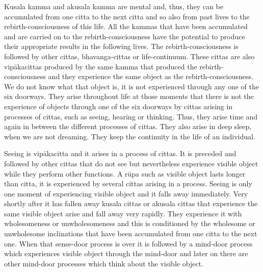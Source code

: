 Kusala kamma and akusala kamma are mental and, thus, they can be
accumulated from one citta to the next citta and so also from past lives
to the rebirth-consciousness of this life. All the kammas that have been
accumulated and are carried on to the rebirth-consciousness have the
potential to produce their appropriate results in the following lives.
The rebirth-consciousness is followed by other cittas, bhavanga-cittas
or life-continuum. These cittas are also vipākacittas produced by the
same kamma that produced the rebirth-consciousness and they experience
the same object as the rebirth-consciousness. We do not know what that
object is, it is not experienced through any one of the six doorways.
They arise throughout life at those moments that there is not the
experience of objects through one of the six doorways by cittas arising
in processes of cittas, such as seeing, hearing or thinking. Thus, they
arise time and again in between the different processes of cittas. They
also arise in deep sleep, when we are not dreaming. They keep the
continuity in the life of an individual.

Seeing is vipākacitta and it arises in a process of cittas. It is
preceded and followed by other cittas that do not see but nevertheless
experience visible object while they perform other functions. A rūpa
such as visible object lasts longer than citta, it is experienced by
several cittas arising in a process. Seeing is only one moment of
experiencing visible object and it falls away immediately. Very shortly
after it has fallen away kusala cittas or akusala cittas that experience
the same visible object arise and fall away very rapidly. They
experience it with wholesomeness or unwholesomeness and this is
conditioned by the wholesome or unwholesome inclinations that have been
accumulated from one citta to the next one. When that sense-door process
is over it is followed by a mind-door process which experiences visible
object through the mind-door and later on there are other mind-door
processes which think about the visible object.

